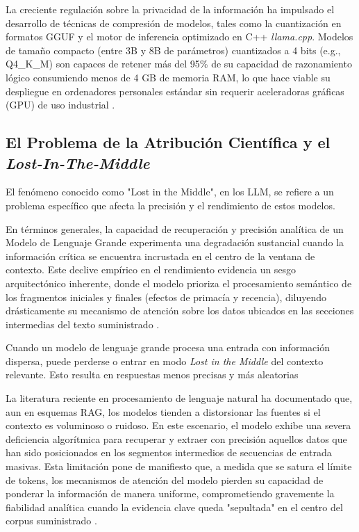 \documentclass[12pt,a4paper]{article}
\begin{document}
La creciente regulación sobre la privacidad de la información ha impulsado el desarrollo de técnicas de compresión de modelos, tales como la cuantización en formatos GGUF y el motor de inferencia optimizado en C++ \textit{llama.cpp}. Modelos de tamaño compacto (entre 3B y 8B de parámetros) cuantizados a 4 bits (e.g., Q4\_K\_M) son capaces de retener más del 95\% de su capacidad de razonamiento lógico consumiendo menos de 4 GB de memoria RAM, lo que hace viable su despliegue en ordenadores personales estándar sin requerir aceleradoras gráficas (GPU) de uso industrial \cite{kurt2026quantization}.

\subsection{El Problema de la Atribución Científica y el \textit{Lost-In-The-Middle}}


El fenómeno conocido como "Lost in the Middle", en los LLM, se refiere a un problema específico que afecta la precisión y el rendimiento de estos modelos.

En términos generales, la capacidad de recuperación y precisión analítica de un Modelo de Lenguaje Grande experimenta una degradación sustancial cuando la información crítica se encuentra incrustada en el centro de la ventana de contexto. Este declive empírico en el rendimiento evidencia un sesgo arquitectónico inherente, donde el modelo prioriza el procesamiento semántico de los fragmentos iniciales y finales (efectos de primacía y recencia), diluyendo drásticamente su mecanismo de atención sobre los datos ubicados en las secciones intermedias del texto suministrado \cite{samanta2026reproducing}.

Cuando un modelo de lenguaje grande procesa una entrada con información dispersa, puede perderse o entrar en modo \textit{Lost in the Middle} del contexto relevante. Esto resulta en respuestas menos precisas y más aleatorias

La literatura reciente en procesamiento de lenguaje natural ha documentado que, aun en esquemas RAG, los modelos tienden a distorsionar las fuentes si el contexto es voluminoso o ruidoso. En este escenario, el modelo exhibe una severa deficiencia algorítmica para recuperar y extraer con precisión aquellos datos que han sido posicionados en los segmentos intermedios de secuencias de entrada masivas. Esta limitación pone de manifiesto que, a medida que se satura el límite de tokens, los mecanismos de atención del modelo pierden su capacidad de ponderar la información de manera uniforme, comprometiendo gravemente la fiabilidad analítica cuando la evidencia clave queda "sepultada" en el centro del corpus suministrado \cite{shim2026beyond}.
\end{document}

